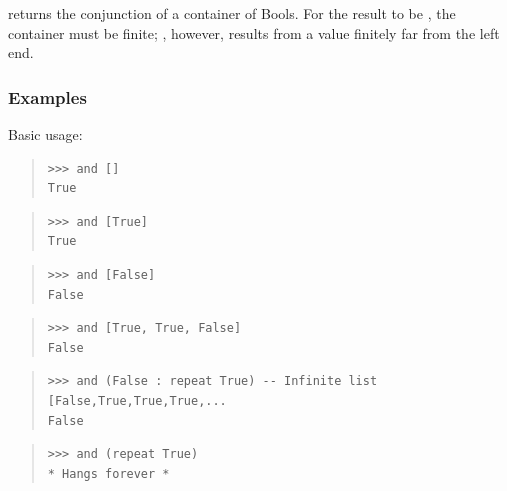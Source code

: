 \begin{haddockdesc}
\item[\begin{tabular}{@{}l}
and :: Foldable t => t Bool -> Bool
\end{tabular}]
{\haddockbegindoc
{} returns the conjunction of a container of Bools.  For the
 result to be , the container must be finite; , however,
 results from a  value finitely far from the left end.\par
\subsubsection*{\textbf{Examples}}
Basic usage:\par
\begin{quote}
{\haddockverb\begin{verbatim}
>>> and []
True

\end{verbatim}}
\end{quote}
\begin{quote}
{\haddockverb\begin{verbatim}
>>> and [True]
True

\end{verbatim}}
\end{quote}
\begin{quote}
{\haddockverb\begin{verbatim}
>>> and [False]
False

\end{verbatim}}
\end{quote}
\begin{quote}
{\haddockverb\begin{verbatim}
>>> and [True, True, False]
False

\end{verbatim}}
\end{quote}
\begin{quote}
{\haddockverb\begin{verbatim}
>>> and (False : repeat True) -- Infinite list [False,True,True,True,...
False

\end{verbatim}}
\end{quote}
\begin{quote}
{\haddockverb\begin{verbatim}
>>> and (repeat True)
* Hangs forever *

\end{verbatim}}
\end{quote}}
\end{haddockdesc}
